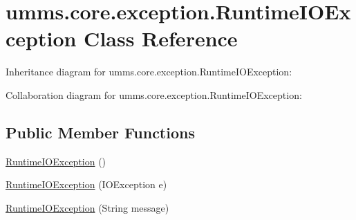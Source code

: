 \hypertarget{classumms_1_1core_1_1exception_1_1_runtime_i_o_exception}{\section{umms.\+core.\+exception.\+Runtime\+I\+O\+Exception Class Reference}
\label{classumms_1_1core_1_1exception_1_1_runtime_i_o_exception}
}


Inheritance diagram for umms.\+core.\+exception.\+Runtime\+I\+O\+Exception\+:


Collaboration diagram for umms.\+core.\+exception.\+Runtime\+I\+O\+Exception\+:
\subsection*{Public Member Functions}
\begin{DoxyCompactItemize}
\item 
\hyperlink{classumms_1_1core_1_1exception_1_1_runtime_i_o_exception_aaaccb03bc5a20470d6a27bfcabe93697}{Runtime\+I\+O\+Exception} ()
\item 
\hyperlink{classumms_1_1core_1_1exception_1_1_runtime_i_o_exception_a4745235e77a4a4ef4f73907617613018}{Runtime\+I\+O\+Exception} (I\+O\+Exception e)
\item 
\hyperlink{classumms_1_1core_1_1exception_1_1_runtime_i_o_exception_a15fef45af6fde4da96aef79e998ab27b}{Runtime\+I\+O\+Exception} (String message)
\end{DoxyCompactItemize}


